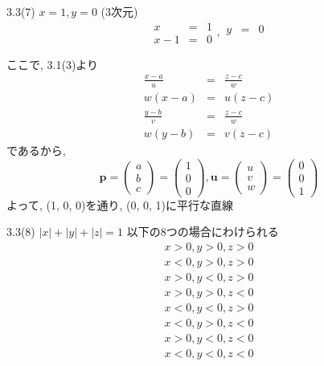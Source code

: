 \documentclass{beamer}
\begin{document}
\begin{frame}{3.3(7) $x = 1, y=0$ (3次元)}
  \begin{equation*}
    \begin{array}{ccc}
      x &=& 1\\
      x-1 &=& 0
    \end{array},
    \begin{array}{ccc}
      y &=& 0\\
      &&
    \end{array}
  \end{equation*}

  ここで, 3.1(3)より
  \begin{eqnarray*}
    \frac{x-a}{u} &=& \frac{z-c}{w} \\
    w(x-a) &=& u(z-c) \\
    \frac{y-b}{v} &=& \frac{z-c}{w} \\
    w(y-b) &=& v(z-c)
  \end{eqnarray*}
  であるから, 
  \begin{equation*}
    \bm{p} = 
    \begin{pmatrix}
      a\\
      b\\
      c
    \end{pmatrix} =
    \begin{pmatrix}
      1\\
      0\\
      0
    \end{pmatrix} , 
    \bm{u} =
    \begin{pmatrix}
      u\\
      v\\
      w
    \end{pmatrix} = 
    \begin{pmatrix}
      0\\
      0\\
      1
    \end{pmatrix}
  \end{equation*}
  よって, (1, 0, 0)を通り, (0, 0, 1)に平行な直線
\end{frame}



\begin{frame}{3.3(8) $|x| + |y| + |z|  = 1$}
  以下の8つの場合にわけられる
  \begin{eqnarray*}
    x > 0, y > 0, z > 0 \\
    x < 0, y > 0, z > 0 \\
    x > 0, y < 0, z > 0 \\
    x > 0, y > 0, z < 0 \\
    x < 0, y < 0, z > 0 \\
    x < 0, y > 0, z < 0 \\
    x > 0, y < 0, z < 0 \\
    x < 0, y < 0, z < 0 
  \end{eqnarray*}
\end{frame}
\end{document}
